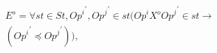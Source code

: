 \documentclass{sig-alternate-05-2015}
\begin{document}
 \begin{align}\label{eqn:Strict}
\begin{split}
E^{s} =  \forall \mathit{st} \in \mathit{St}, {\mathit{Op}^i}^{'}, {\mathit{Op}^j}^{'} \in \mathit{st} \big( \mathit{Op}^i X^o {\mathit{Op}^j}^{'} \in \mathit{st}
\rightarrow \\ \left( {\mathit{Op}^i}^{'} \preccurlyeq {\mathit{Op}^j}^{'} \right) \big), %

\end{split}
\end{align}
\end{document}
